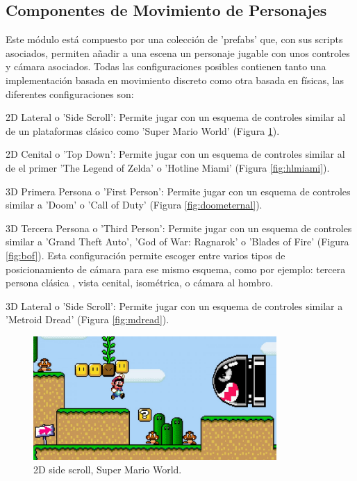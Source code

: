 \subsection{Componentes de Movimiento de Personajes}
Este módulo está compuesto por una colección de 'prefabs' que, con sus scripts asociados, permiten añadir a una escena un personaje jugable con unos controles y cámara asociados.
Todas las configuraciones posibles contienen tanto una implementación basada en movimiento discreto como otra basada en físicas, las diferentes configuraciones son: 
\begin{compactitem}
  \item 2D Lateral o 'Side Scroll': Permite jugar con un esquema de controles similar al de un plataformas clásico como 'Super Mario World' (Figura \ref{fig:smbw}).
  \item 2D Cenital o 'Top Down': Permite jugar con un esquema de controles similar al de el primer 'The Legend of Zelda' o 'Hotline Miami' (Figura \ref{fig:hlmiami}).
  \item 3D Primera Persona o 'First Person': Permite jugar con un esquema de controles similar a 'Doom' o 'Call of Duty' (Figura \ref{fig:doometernal}).
  \item 3D Tercera Persona o 'Third Person': Permite jugar con un esquema de controles similar a 'Grand Theft Auto', 'God of War: Ragnarok' o 'Blades of Fire' (Figura \ref{fig:bof}). Esta configuración permite escoger entre varios 
   tipos de posicionamiento de cámara para ese mismo esquema, como por ejemplo: tercera persona clásica , vista cenital, isométrica, o cámara al hombro. 
  \item 3D Lateral o 'Side Scroll': Permite jugar con un esquema de controles similar a 'Metroid Dread' (Figura \ref{fig:mdread}).
\end{compactitem}
\raggedbottom
\begin{figure}[H]
  \centering
    \includegraphics[width=350px,clip=true]{super_mario_world.jpg}
  \caption{2D side scroll, Super Mario World.}
  \label{fig:smbw}
\end{figure}

